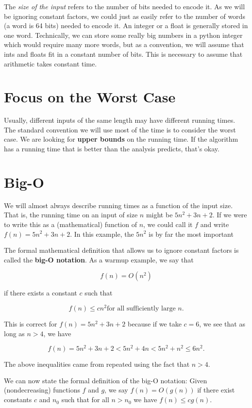 The \emph{size of the input} refers to the number of bits needed to encode it.
As we will be ignoring constant factors, we could just as easily refer to the number of words (a word is 64 bits) needed to encode it.
An integer or a float is generally stored in one word.
Technically, we can store some really big numbers in a python integer which would require many more words, but as a convention, we will assume that ints and floats fit in a constant number of bits.
This is necessary to assume that arithmetic takes constant time.

\section{Focus on the Worst Case}


Usually, different inputs of the same length may have different running times.
The standard convention we will use most of the time is to consider the worst case.
We are looking for \textbf{upper bounds} on the running time.
If the algorithm has a running time that is better than the analysis predicts, that's okay.

\section{Big-O}


We will almost always describe running times as a function of the input size.
That is, the running time on an input of size $n$ might be $5n^2 + 3n + 2$.
If we were to write this as a (mathematical) function of $n$, we could call it $f$ and write $f(n) = 5n^2 + 3n + 2$.
In this example, the $5n^2$ is by far the most important


The formal mathematical definition that allows us to ignore constant factors is called the \textbf{big-O notation}.
As a warmup example, we say that


\[
f(n) = O(n^2)
\]


if there exists a constant $c$ such that


\[
f(n) \le cn^2 \text{for all sufficiently large } n.
\]


This is correct for $f(n) = 5n^2 + 3n + 2$ because if we take $c = 6$, we see that as long as $n > 4$, we have


\[
f(n) = 5n^2 + 3n + 2 < 5n^2 + 4n < 5n^2 + n^2 \le 6n^2.
\]


The above inequalities came from repeated using the fact that $n > 4$.


We can now state the formal definition of the big-O notation:
Given (nondecreasing) functions $f$ and $g$, we say $f(n) = O(g(n))$ if there exist constants $c$ and $n_0$ such that for all $n>n_0$ we have $f(n) \le cg(n)$.

